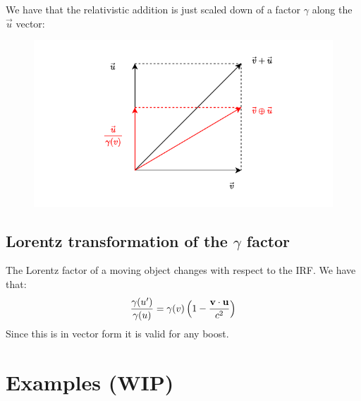 We have that the relativistic addition is just scaled down of a factor $\gamma$ along the $\vec{u}$ vector:
\begin{figure}[H]
  \centering
  \includegraphics[width=0.8\linewidth]{res/svg/relativistic_addition.drawio}
\end{figure}
\subsection{Lorentz transformation of the $\gamma$ factor}
The Lorentz factor of a moving object changes with respect to the IRF. We have that:
\begin{equation}
  \dfrac{\gamma(u')}{\gamma(u)} = \gamma(v)\left(1-\dfrac{\vb{v}\cdot\vb{u}}{c^2}\right)
\end{equation}
Since this is in vector form it is valid for any boost.
\section{Examples (WIP)}
